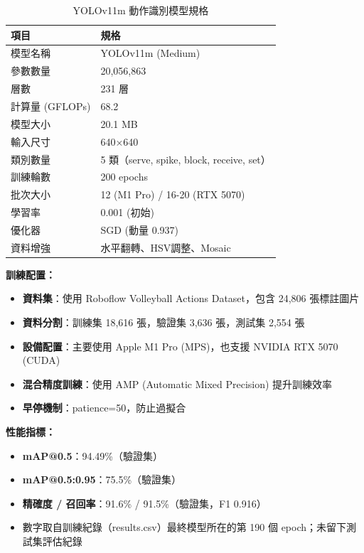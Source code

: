 \documentclass[a4paper,14pt,oneside]{article}
\begin{document}
\begin{table}[H]
    \centering
    \caption{YOLOv11m 動作識別模型規格}
    \begin{tabular}{|l|l|}
        \hline
        \textbf{項目} & \textbf{規格} \\
        \hline
        模型名稱 & YOLOv11m (Medium) \\
        \hline
        參數數量 & 20,056,863 \\
        \hline
        層數 & 231 層 \\
        \hline
        計算量 (GFLOPs) & 68.2 \\
        \hline
        模型大小 & 20.1 MB \\
        \hline
        輸入尺寸 & 640×640 \\
        \hline
        類別數量 & 5 類（serve, spike, block, receive, set） \\
        \hline
        訓練輪數 & 200 epochs \\
        \hline
        批次大小 & 12 (M1 Pro) / 16-20 (RTX 5070) \\
        \hline
        學習率 & 0.001 (初始) \\
        \hline
        優化器 & SGD (動量 0.937) \\
        \hline
        資料增強 & 水平翻轉、HSV調整、Mosaic \\
        \hline
    \end{tabular}
\end{table}

\textbf{訓練配置：}

\begin{itemize}
    \item \textbf{資料集}：使用 Roboflow Volleyball Actions Dataset，包含 24,806 張標註圖片
    \item \textbf{資料分割}：訓練集 18,616 張，驗證集 3,636 張，測試集 2,554 張
    \item \textbf{設備配置}：主要使用 Apple M1 Pro (MPS)，也支援 NVIDIA RTX 5070 (CUDA)
    \item \textbf{混合精度訓練}：使用 AMP (Automatic Mixed Precision) 提升訓練效率
    \item \textbf{早停機制}：patience=50，防止過擬合
\end{itemize}

\textbf{性能指標：}

\begin{itemize}
    \item \textbf{mAP@0.5}：94.49\%（驗證集）
    \item \textbf{mAP@0.5:0.95}：75.5\%（驗證集）
    \item \textbf{精確度 / 召回率}：91.6\% / 91.5\%（驗證集，F1 0.916）
    \item 數字取自訓練紀錄（results.csv）最終模型所在的第 190 個 epoch；未留下測試集評估紀錄
\end{itemize}
\end{document}
